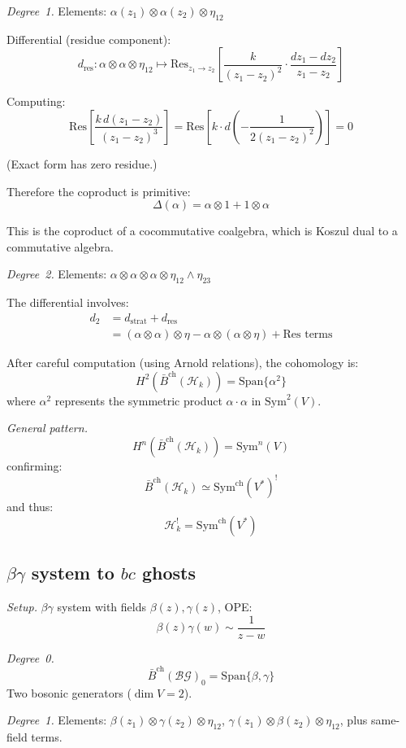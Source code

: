 \emph{Degree~1.}
Elements: $\alpha(z_1) \otimes \alpha(z_2) \otimes \eta_{12}$

Differential (residue component):
\[d_{\text{res}}: \alpha \otimes \alpha \otimes \eta_{12} \mapsto 
   \text{Res}_{z_1 \to z_2}\left[\frac{k}{(z_1-z_2)^2} \cdot \frac{dz_1-dz_2}{z_1-z_2}\right]\]

Computing:
\[\text{Res}\left[\frac{k \, d(z_1-z_2)}{(z_1-z_2)^3}\right] = 
   \text{Res}\left[k \cdot d\left(-\frac{1}{2(z_1-z_2)^2}\right)\right] = 0\]

(Exact form has zero residue.)

Therefore the coproduct is primitive:
\[\Delta(\alpha) = \alpha \otimes 1 + 1 \otimes \alpha\]

This is the coproduct of a cocommutative coalgebra, which is Koszul dual to a
commutative algebra.

\emph{Degree~2.}
Elements: $\alpha \otimes \alpha \otimes \alpha \otimes \eta_{12} \wedge \eta_{23}$

The differential involves:
\begin{align*}
d_2 &= d_{\text{strat}} + d_{\text{res}} \\
&= (\alpha \otimes \alpha) \otimes \eta - \alpha \otimes (\alpha \otimes \eta) + 
    \text{Res terms}
\end{align*}

After careful computation (using Arnold relations), the cohomology is:
\[H^2(\bar{B}^{\text{ch}}(\mathcal{H}_k)) = \text{Span}\{\alpha^2\}\]
where $\alpha^2$ represents the symmetric product $\alpha \cdot \alpha$ in 
$\text{Sym}^2(V)$.

\emph{General pattern.}
\[H^n(\bar{B}^{\text{ch}}(\mathcal{H}_k)) = \text{Sym}^n(V)\]
confirming:
\[\bar{B}^{\text{ch}}(\mathcal{H}_k) \simeq \mathrm{Sym}^{\mathrm{ch}}(V^*)^!\]
and thus:
\[\mathcal{H}_k^! = \mathrm{Sym}^{\mathrm{ch}}(V^*)\]

\subsection{\texorpdfstring{$\beta\gamma$ system to $bc$ ghosts}{Beta-gamma system to bc ghosts}}

\noindent\emph{Setup.} $\beta\gamma$ system with fields $\beta(z), \gamma(z)$, OPE:
\[\beta(z)\gamma(w) \sim \frac{1}{z-w}\]

\emph{Degree~0.}
\[\bar{B}^{\text{ch}}(\mathcal{BG})_0 = \text{Span}\{\beta, \gamma\}\]
Two bosonic generators ($\dim V = 2$).

\emph{Degree~1.}
Elements: $\beta(z_1) \otimes \gamma(z_2) \otimes \eta_{12}$,
$\gamma(z_1) \otimes \beta(z_2) \otimes \eta_{12}$, plus same-field terms.

